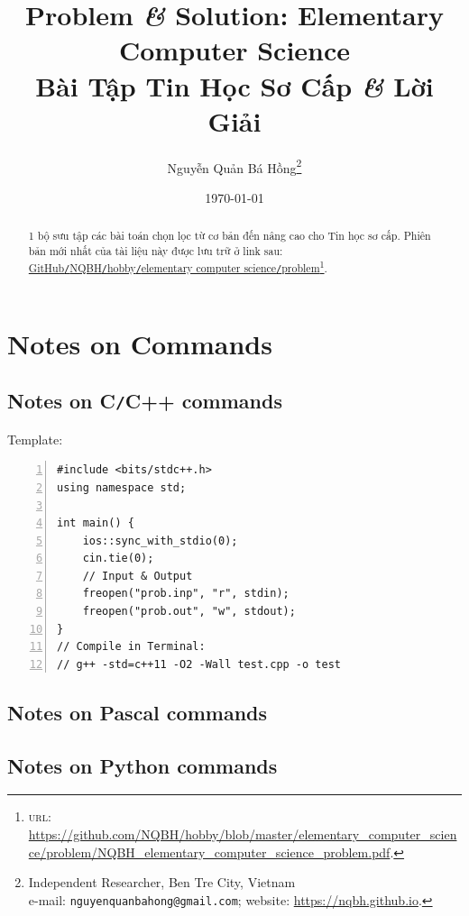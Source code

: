 \documentclass{article}
\title{Problem \textit{\&} Solution: Elementary Computer Science\\Bài Tập Tin Học Sơ Cấp \textit{\&} Lời Giải}
\author{Nguyễn Quản Bá Hồng\footnote{Independent Researcher, Ben Tre City, Vietnam\\e-mail: \texttt{nguyenquanbahong@gmail.com}; website: \url{https://nqbh.github.io}.}}
\date{\today}
\begin{document}
\maketitle
\begin{abstract}
	1 bộ sưu tập các bài toán chọn lọc từ cơ bản đến nâng cao cho Tin học sơ cấp. Phiên bản mới nhất của tài liệu này được lưu trữ ở link sau: \href{https://github.com/NQBH/hobby/blob/master/elementary_computer_science/problem/NQBH_elementary_computer_science_problem.pdf}{GitHub\texttt{/}NQBH\texttt{/}hobby\texttt{/}elementary computer science\texttt{/}problem}\footnote{\textsc{url}: \url{https://github.com/NQBH/hobby/blob/master/elementary_computer_science/problem/NQBH_elementary_computer_science_problem.pdf}.}.
\end{abstract}
\tableofcontents


\section{Notes on Commands}

\subsection{Notes on C\texttt{/}C++ commands}
Template:
\begin{Verbatim}[numbers=left,xleftmargin=5mm]
#include <bits/stdc++.h>
using namespace std;

int main() {
    ios::sync_with_stdio(0);
    cin.tie(0);
    // Input & Output
    freopen("prob.inp", "r", stdin);
    freopen("prob.out", "w", stdout);	
}
// Compile in Terminal:
// g++ -std=c++11 -O2 -Wall test.cpp -o test
\end{Verbatim}

\subsection{Notes on Pascal commands}

\subsection{Notes on Python commands}
\end{document}
